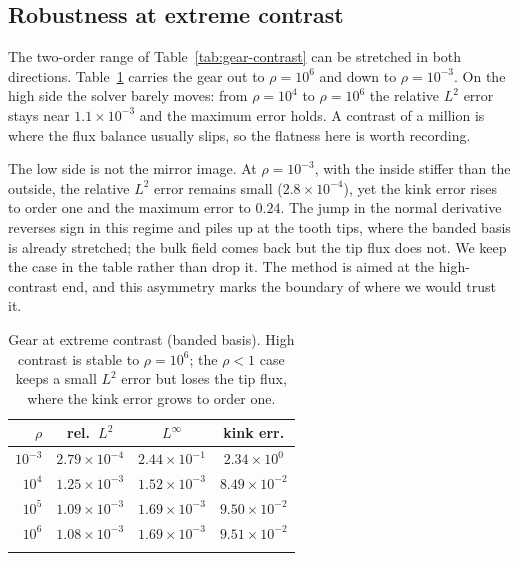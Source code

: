 \documentclass[pdflatex,sn-mathphys-num]{sn-jnl}%
\theoremstyle{thmstyleone}%
\theoremstyle{thmstyletwo}%
\theoremstyle{thmstylethree}%
\begin{document}
\subsection{Robustness at extreme contrast}\label{subsec:extreme}
The two-order range of Table~\ref{tab:gear-contrast} can be stretched in both directions. Table~\ref{tab:extreme} carries the gear out to $\rho=10^6$ and down to $\rho=10^{-3}$. On the high side the solver barely moves: from $\rho=10^4$ to $\rho=10^6$ the relative $L^2$ error stays near $1.1\times10^{-3}$ and the maximum error holds. A contrast of a million is where the flux balance usually slips, so the flatness here is worth recording.

The low side is not the mirror image. At $\rho=10^{-3}$, with the inside stiffer than the outside, the relative $L^2$ error remains small ($2.8\times10^{-4}$), yet the kink error rises to order one and the maximum error to $0.24$. The jump in the normal derivative reverses sign in this regime and piles up at the tooth tips, where the banded basis is already stretched; the bulk field comes back but the tip flux does not. We keep the case in the table rather than drop it. The method is aimed at the high-contrast end, and this asymmetry marks the boundary of where we would trust it.

\begin{table}[t]
\caption{Gear at extreme contrast (banded basis). High contrast is stable to $\rho=10^6$; the $\rho<1$ case keeps a small $L^2$ error but loses the tip flux, where the kink error grows to order one.}\label{tab:extreme}%
\begin{tabular}{@{}rccc@{}}
\toprule
$\rho$ & rel.\ $L^2$ & $L^\infty$ & kink err. \\
\midrule
$10^{-3}$ & $2.79\times10^{-4}$ & $2.44\times10^{-1}$ & $2.34\times10^{0}$ \\
$10^{4}$  & $1.25\times10^{-3}$ & $1.52\times10^{-3}$ & $8.49\times10^{-2}$ \\
$10^{5}$  & $1.09\times10^{-3}$ & $1.69\times10^{-3}$ & $9.50\times10^{-2}$ \\
$10^{6}$  & $1.08\times10^{-3}$ & $1.69\times10^{-3}$ & $9.51\times10^{-2}$ \\
\botrule
\end{tabular}
\end{table}
\end{document}
